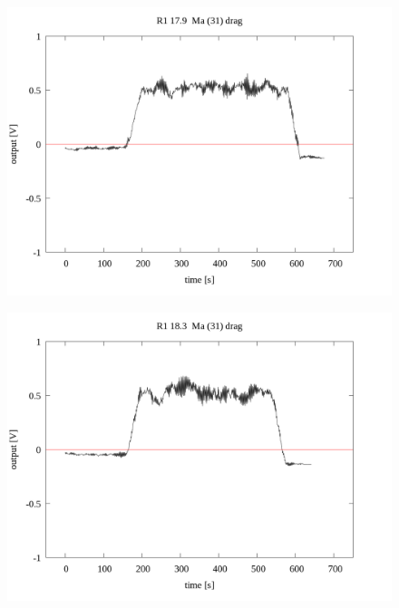 \documentclass[a4paper]{jsarticle}
\begin{document}
\begin{figure}[htbp]
    \footnotesize
    \begin{center}
        \includegraphics[width=140mm]{../../../33_result/210806/moving_average/31/drag/R1_17.9_ma(31)_drag.png}
    \end{center}
\end{figure}

\begin{figure}[htbp]
    \footnotesize
    \begin{center}
        \includegraphics[width=140mm]{../../../33_result/210806/moving_average/31/drag/R1_18.6_ma(31)_drag.png}
    \end{center}
\end{figure}
\end{document}
